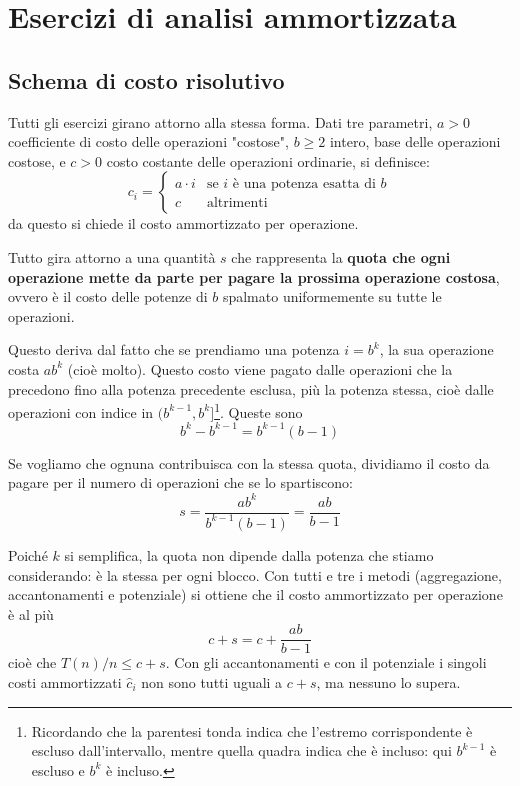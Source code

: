 \chapter{Esercizi di analisi ammortizzata}\label{ch:appendice_esercizi_analisi_ammortizzata}

\section{Schema di costo risolutivo}\label{sec:appendice_esercizi_analisi_ammortizzata_schema}
Tutti gli esercizi girano attorno alla stessa forma. Dati tre parametri, $a > 0$ coefficiente di costo delle operazioni "costose", $b \ge 2$ intero, base delle operazioni costose, e $c > 0$ costo costante delle operazioni ordinarie, si definisce:
\begin{equation}
    c_i =
    \begin{cases}
        a \cdot i & \text{se } i \text{ è una potenza esatta di } b \\
        c & \text{altrimenti}
    \end{cases}
    \label{eq:appendice_esercizi_analisi_ammortizzata_schema_costo}
\end{equation}
da questo si chiede il costo ammortizzato per operazione.

Tutto gira attorno a una quantità $s$ che rappresenta la \textbf{quota che ogni operazione mette da parte per pagare la prossima operazione costosa}, ovvero è il costo delle potenze di $b$ spalmato uniformemente su tutte le operazioni. 

Questo deriva dal fatto che se prendiamo una potenza $i = b^k$, la sua operazione costa $ab^k$ (cioè molto). Questo costo viene pagato dalle operazioni che la precedono fino alla potenza precedente esclusa, più la potenza stessa, cioè dalle operazioni con indice in $(b^{k-1}, b^k]$\footnote{Ricordando che la parentesi tonda indica che l'estremo corrispondente è escluso dall'intervallo, mentre quella quadra indica che è incluso: qui $b^{k-1}$ è escluso e $b^k$ è incluso.}. Queste sono
\[
b^k - b^{k-1} = b^{k-1}(b-1)
\]

Se vogliamo che ognuna contribuisca con la stessa quota, dividiamo il costo da pagare per il numero di operazioni che se lo spartiscono:
\begin{equation}
s = \frac{ab^k}{b^{k-1}(b-1)} = \frac{ab}{b-1}
\label{eq:appendice_esercizi_analisi_ammortizzata_schema_quota}
\end{equation}

Poiché $k$ si semplifica, la quota non dipende dalla potenza che stiamo considerando: è la stessa per ogni blocco. Con tutti e tre i metodi (aggregazione, accantonamenti e potenziale) si ottiene che il costo ammortizzato per operazione è al più
\begin{equation}
    c + s = c + \frac{ab}{b-1}
    \label{eq:appendice_esercizi_analisi_ammortizzata_schema_costo_ammortizzato}
\end{equation}
cioè che $T(n)/n \le c+s$. Con gli accantonamenti e con il potenziale i singoli costi ammortizzati $\hat{c}_i$ non sono tutti uguali a $c+s$, ma nessuno lo supera.

